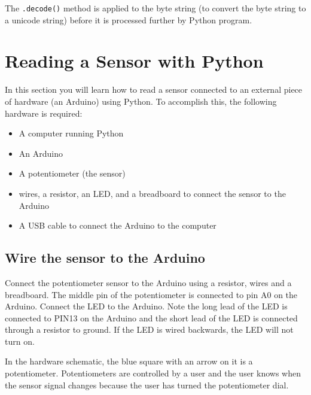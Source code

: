\documentclass{book}
\providecommand{\tightlist}{%
      \setlength{\itemsep}{0pt}\setlength{\parskip}{0pt}}
\begin{document}
The \lstinline!.decode()! method is applied to the byte string (to
convert the byte string to a unicode string) before it is processed
further by Python program.
    




    
        \section{Reading a Sensor with
Python}\label{reading-a-sensor-with-python}
    




    
        In this section you will learn how to read a sensor connected to an
external piece of hardware (an Arduino) using Python. To accomplish
this, the following hardware is required:

\begin{itemize}
\tightlist
\item
  A computer running Python
\item
  An Arduino
\item
  A potentiometer (the sensor)
\item
  wires, a resistor, an LED, and a breadboard to connect the sensor to
  the Arduino
\item
  A USB cable to connect the Arduino to the computer
\end{itemize}
    




    
        \subsection{Wire the sensor to the
Arduino}\label{wire-the-sensor-to-the-arduino}
    




    
        Connect the potentiometer sensor to the Arduino using a resistor, wires
and a breadboard. The middle pin of the potentiometer is connected to
pin A0 on the Arduino. Connect the LED to the Arduino. Note the long
lead of the LED is connected to PIN13 on the Arduino and the short lead
of the LED is connected through a resistor to ground. If the LED is
wired backwards, the LED will not turn on.

In the hardware schematic, the blue square with an arrow on it is a
potentiometer. Potentiometers are controlled by a user and the user
knows when the sensor signal changes because the user has turned the
potentiometer dial.
\end{document}

